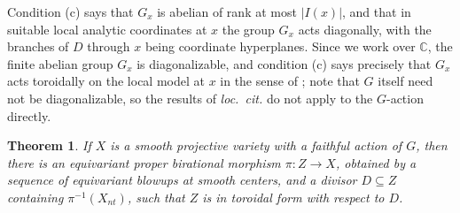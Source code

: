 \documentclass[11pt]{amsart}
\theoremstyle{plain}
\newtheorem{theorem}{Theorem}[section]
\theoremstyle{definition}
\theoremstyle{remark}
\numberwithin{equation}{section}
\begin{document}
Condition (c) says that $G_x$ is abelian of rank at most $|I(x)|$, and that
in suitable local analytic coordinates at $x$ the group $G_x$ acts
diagonally, with the branches of $D$ through $x$ being coordinate
hyperplanes.  Since we work over $\mathbb{C}$, the finite abelian group $G_x$
is diagonalizable, and condition (c) says precisely that $G_x$ acts
toroidally on the local model at $x$ in the sense of
\cite{AbramovichTemkin}; note that $G$ itself need not be diagonalizable, so
the results of \emph{loc.\ cit.} do not apply to the $G$-action directly.

\begin{theorem} \label{thm:toroidal_resolution}
If $X$ is a smooth projective variety with a faithful action of $G$, then
there is an equivariant proper birational morphism $\pi : Z \to X$, obtained
by a sequence of equivariant blowups at smooth centers, and a divisor
$D \subseteq Z$ containing $\pi^{-1}(X_{nt})$, such that $Z$ is in toroidal
form with respect to $D$.
\end{theorem}
\end{document}
